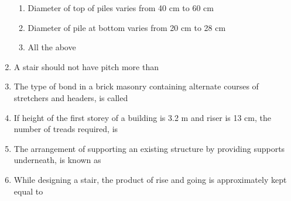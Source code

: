 \documentclass[11pt,a4paper]{article}
\begin{document}
\begin{enumerate}
\begin{enumerate}[label=\Alph*.]
\item{Diameter of top of piles varies from 40 cm to 60 cm}
\item{Diameter of pile at bottom varies from 20 cm to 28 cm}
\item{All the above}
\end{enumerate}
\item{A stair should not have pitch more than}
\\
\item{The type of bond in a brick masonry containing alternate courses of stretchers and headers, is called}
\\
\item{If height of the first storey of a building is 3.2 m and riser is 13 cm, the number of treads required, is}
\\
\item{The arrangement of supporting an existing structure by providing supports underneath, is known as}
\\
\item{While designing a stair, the product of rise and going is approximately kept equal to}

\end{enumerate}
\end{document}
